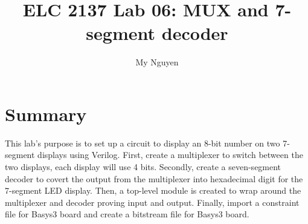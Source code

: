 \documentclass[11pt]{article}
\begin{document}
\title{ELC 2137 Lab 06: MUX and 7-segment decoder}
\author{My Nguyen}

\maketitle

\section*{Summary}
This lab's purpose is to set up a circuit to display an 8-bit number on two 7-segment displays using Verilog. First, create a multiplexer to switch between the two displays, each display will use 4 bits. Secondly, create a seven-segment decoder to covert the output from the multiplexer into hexadecimal digit for the 7-segment LED display. Then, a top-level module is created to wrap around the multiplexer and decoder proving input and output. Finally, import a constraint file for Basys3 board and create a bitstream file for Basys3 board. 
\end{document}
